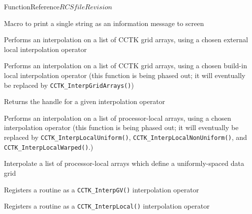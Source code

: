 \begin{cactuspart}{FunctionReference}{$RCSfile$}{$Revision$}
\begin{Lentry}
\item[CCTK\_INFO]
  [\pageref{CCTK-INFO}]
  Macro to print a single string as an information message to screen

\item[CCTK\_InterpGridArrays]
  [\pageref{CCTK-InterpGridArrays}]
  Performs an interpolation on a list of CCTK grid arrays,
  using a chosen external local interpolation operator

\item[CCTK\_InterpGV]
  [\pageref{CCTK-InterpGV}]
  Performs an interpolation on a list of CCTK grid arrays,
  using a chosen build-in local interpolation operator
  (this function is being phased out;
  it will eventually be replaced by \verb|CCTK_InterpGridArrays()|)

\item[CCTK\_InterpHandle]
  [\pageref{CCTK-InterpHandle}]
  Returns the handle for a given interpolation operator

\item[CCTK\_InterpLocal]
  [\pageref{CCTK-InterpLocal}]
  Performs an interpolation on a list of processor-local arrays,
  using a chosen interpolation operator
  (this function is being phased out; it will
   eventually be replaced by \verb|CCTK_InterpLocalUniform()|,
   \verb|CCTK_InterpLocalNonUniform()|, and \verb|CCTK_InterpLocalWarped()|.)


\item[CCTK\_InterpLocalUniform]
  [\pageref{CCTK-InterpLocalUniform}]
  Interpolate a list of processor-local arrays
  which define a uniformly-spaced data grid


\item[CCTK\_InterpRegisterOperatorGV]
  [\pageref{CCTK-InterpRegisterOperatorGV}]
  Registers a routine as a \verb|CCTK_InterpGV()|
  interpolation operator

\item[CCTK\_InterpRegisterOperatorLocal]
  [\pageref{CCTK-InterpRegisterOperatorLocal}]
  Registers a routine as a \verb|CCTK_InterpLocal()|
  interpolation operator


\end{Lentry}
\end{cactuspart}
